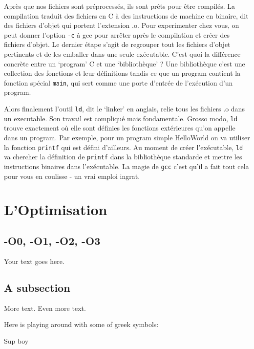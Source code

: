 \documentclass[11pt]{article} %
\begin{document}
Après que nos fichiers sont préprocessés, ils sont prêts pour être compilés. La compilation traduit des fichiers en C à des instructions de machine
en binaire, dit des fichiers d'objet qui portent l'extension .o. Pour experimenter chez vous, on peut donner l'option \verb|-c| à gcc pour arrêter après
le compilation et créer des fichiers d'objet.
    Le dernier étape s'agit de regrouper tout les fichiers d'objet pertinents et de les emballer dans une seule exécutable. C'est quoi la différence concrète entre
un `program' C et une `bibliothèque' ? Une bibliothèque c'est une collection des fonctions et leur définitions tandis ce que un program contient la fonction spécial
\verb|main|, qui sert comme une porte d'entrée de l'exécution d'un program.

    Alors finalement l'outil \verb|ld|, dit le `linker' en anglais, relie tous les fichiers .o dans un executable. Son travail est compliqué mais fondamentale. Grosso modo, \verb|ld|
trouve exactement où elle sont définies les fonctions extérieures qu'on appelle dans un program. Par exemple, pour un program simple HelloWorld on va utiliser la fonction \verb|printf| qui
est défini d'ailleurs. Au moment de créer l'exécutable, \verb|ld| va chercher la définition de \verb|printf| dans la bibliothèque standarde et mettre les instructions binaires dans l'exécutable.
La magie de \verb|gcc| c'est qu'il a fait tout cela pour vous en coulisse - un vrai emploi ingrat.

\section*{L'Optimisation}
\subsection*{-O0, -O1, -O2, -O3}

Your text goes here.

\subsection*{A subsection}

More text.
Even more text.

Here is playing around with some of greek symbols:

\newpage

Sup boy
\end{document}
